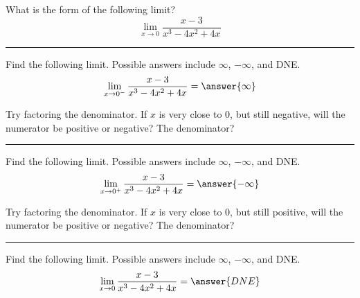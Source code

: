 \documentclass{ximera}
\author{Bobby Ramsey}
\begin{document}

\begin{exercise}


What is the form of the following limit?
	\[ \lim_{x\to 0} \frac{x-3}{x^3-4x^2+4x}\]

	\begin{multipleChoice}
	\end{multipleChoice}
	\noindent\rule[0.5ex]{\linewidth}{0.2pt}

	\begin{exercise}
		Find the following limit.  Possible answers include $\infty$, $-\infty$, and DNE.
		\[ \lim_{x\to0^-}\frac{x-3}{x^3-4x^2+4x} = \answer{\infty} \]
		\begin{hint} Try factoring the denominator.   If $x$ is very close to $0$, but still negative, will the numerator be positive or negative?  The denominator?\end{hint}
		\noindent\rule[0.5ex]{\linewidth}{0.2pt}
	
		\begin{exercise}
			Find the following limit.  Possible answers include $\infty$, $-\infty$, and DNE.
			\[ \lim_{x\to0^+}\frac{x-3}{x^3-4x^2+4x} = \answer{-\infty} \]
			\begin{hint} Try factoring the denominator.   If $x$ is very close to $0$, but still positive, will the numerator be positive or negative?  The denominator?\end{hint}
			\noindent\rule[0.5ex]{\linewidth}{0.2pt}
			
			\begin{exercise}
				Find the following limit.  Possible answers include $\infty$, $-\infty$, and DNE.
				\[ \lim_{x\to0}\frac{x-3}{x^3-4x^2+4x} = \answer{DNE} \]
			\end{exercise}
		\end{exercise}
	\end{exercise}
\end{exercise}
\end{document}

